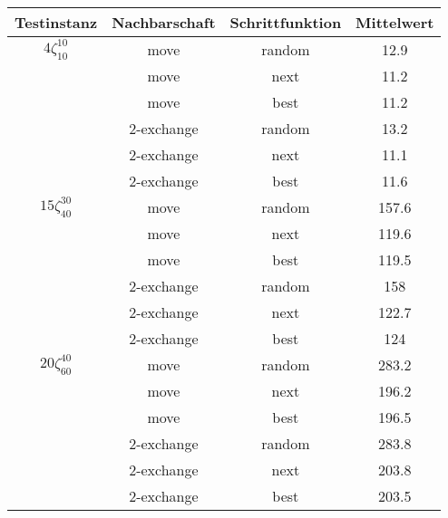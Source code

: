 \documentclass[a4paper,10pt]{article}
\begin{document}
\begin{center}
\begin{tabular}{cccc}
\hline
Testinstanz & Nachbarschaft & Schrittfunktion & Mittelwert \\
\hline
$4\zeta_{10}^{10}$ & move & random &  12.9 \\
							 		& move & next &  11.2 \\
									& move & best &  11.2 \\
							 		& 2-exchange & random &  13.2 \\
							 		& 2-exchange & next &  11.1 \\
									& 2-exchange & best &  11.6 \\
\hline									
$15\zeta_{40}^{30}$ & move & random &  157.6 \\
							 		& move & next &  119.6 \\
									& move & best &  119.5 \\
							 		& 2-exchange & random &  158 \\
							 		& 2-exchange & next &  122.7 \\
									& 2-exchange & best &  124 \\
\hline									
$20\zeta_{60}^{40}$ & move & random &  283.2 \\
							 		& move & next &  196.2 \\
									& move & best &  196.5 \\
							 		& 2-exchange & random &  283.8 \\
							 		& 2-exchange & next &  203.8 \\
									& 2-exchange & best &  203.5 \\
\hline									
\end{tabular}
\end{center}
\end{document}
